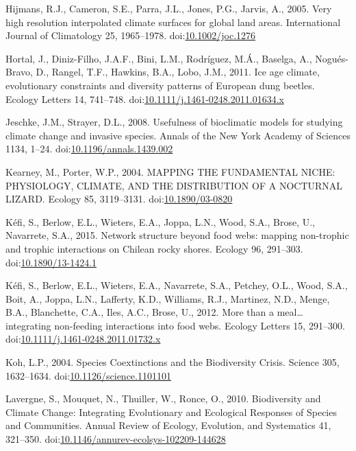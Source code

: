 \hypertarget{ref-Hijmans2005}{}
Hijmans, R.J., Cameron, S.E., Parra, J.L., Jones, P.G., Jarvis, A.,
2005. Very high resolution interpolated climate surfaces for global land
areas. International Journal of Climatology 25, 1965--1978.
doi:\href{https://doi.org/10.1002/joc.1276}{10.1002/joc.1276}

\hypertarget{ref-Hortal2011}{}
Hortal, J., Diniz-Filho, J.A.F., Bini, L.M., Rodríguez, M.Á., Baselga,
A., Nogués-Bravo, D., Rangel, T.F., Hawkins, B.A., Lobo, J.M., 2011. Ice
age climate, evolutionary constraints and diversity patterns of European
dung beetles. Ecology Letters 14, 741--748.
doi:\href{https://doi.org/10.1111/j.1461-0248.2011.01634.x}{10.1111/j.1461-0248.2011.01634.x}

\hypertarget{ref-Jeschke2008}{}
Jeschke, J.M., Strayer, D.L., 2008. Usefulness of bioclimatic models for
studying climate change and invasive species. Annals of the New York
Academy of Sciences 1134, 1--24.
doi:\href{https://doi.org/10.1196/annals.1439.002}{10.1196/annals.1439.002}

\hypertarget{ref-Kearney2004}{}
Kearney, M., Porter, W.P., 2004. MAPPING THE FUNDAMENTAL NICHE:
PHYSIOLOGY, CLIMATE, AND THE DISTRIBUTION OF A NOCTURNAL LIZARD. Ecology
85, 3119--3131.
doi:\href{https://doi.org/10.1890/03-0820}{10.1890/03-0820}

\hypertarget{ref-Kefi2015}{}
Kéfi, S., Berlow, E.L., Wieters, E.A., Joppa, L.N., Wood, S.A., Brose,
U., Navarrete, S.A., 2015. Network structure beyond food webs: mapping
non-trophic and trophic interactions on Chilean rocky shores. Ecology
96, 291--303.
doi:\href{https://doi.org/10.1890/13-1424.1}{10.1890/13-1424.1}

\hypertarget{ref-Kefi2012}{}
Kéfi, S., Berlow, E.L., Wieters, E.A., Navarrete, S.A., Petchey, O.L.,
Wood, S.A., Boit, A., Joppa, L.N., Lafferty, K.D., Williams, R.J.,
Martinez, N.D., Menge, B.A., Blanchette, C.A., Iles, A.C., Brose, U.,
2012. More than a meal\ldots{} integrating non-feeding interactions into
food webs. Ecology Letters 15, 291--300.
doi:\href{https://doi.org/10.1111/j.1461-0248.2011.01732.x}{10.1111/j.1461-0248.2011.01732.x}

\hypertarget{ref-Koh2004}{}
Koh, L.P., 2004. Species Coextinctions and the Biodiversity Crisis.
Science 305, 1632--1634.
doi:\href{https://doi.org/10.1126/science.1101101}{10.1126/science.1101101}

\hypertarget{ref-Lavergne2010}{}
Lavergne, S., Mouquet, N., Thuiller, W., Ronce, O., 2010. Biodiversity
and Climate Change: Integrating Evolutionary and Ecological Responses of
Species and Communities. Annual Review of Ecology, Evolution, and
Systematics 41, 321--350.
doi:\href{https://doi.org/10.1146/annurev-ecolsys-102209-144628}{10.1146/annurev-ecolsys-102209-144628}

